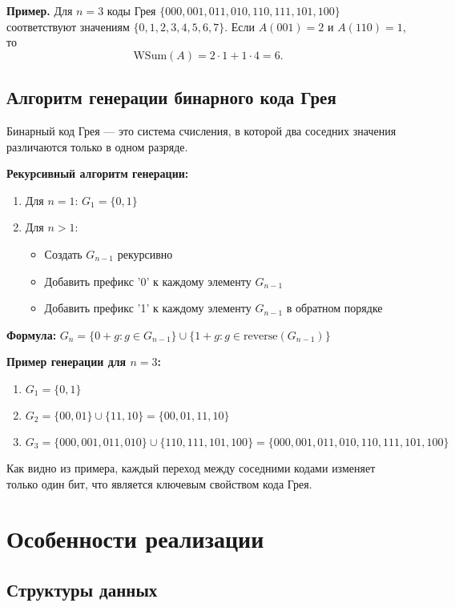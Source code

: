 \documentclass[12pt,a4paper]{article}
\begin{document}
\textbf{Пример.} Для $n=3$ коды Грея $\{000,001,011,010,110,111,101,100\}$ соответствуют значениям $\{0,1,2,3,4,5,6,7\}$. Если $A(001)=2$ и $A(110)=1$, то
$$\text{WSum}(A)=2\cdot 1 + 1\cdot 4 = 6.$$

\subsection{Алгоритм генерации бинарного кода Грея}

Бинарный код Грея — это система счисления, в которой два соседних значения различаются только в одном разряде.

\textbf{Рекурсивный алгоритм генерации:}
\begin{enumerate}
    \item Для $n = 1$: $G_1 = \{0, 1\}$
    \item Для $n > 1$: 
    \begin{itemize}
        \item Создать $G_{n-1}$ рекурсивно
        \item Добавить префикс '0' к каждому элементу $G_{n-1}$
        \item Добавить префикс '1' к каждому элементу $G_{n-1}$ в обратном порядке
    \end{itemize}
\end{enumerate}

\textbf{Формула:} $G_n = \{0 + g : g \in G_{n-1}\} \cup \{1 + g : g \in \text{reverse}(G_{n-1})\}$

\textbf{Пример генерации для $n = 3$:}
\begin{enumerate}
    \item $G_1 = \{0, 1\}$
    \item $G_2 = \{00, 01\} \cup \{11, 10\} = \{00, 01, 11, 10\}$
    \item $G_3 = \{000, 001, 011, 010\} \cup \{110, 111, 101, 100\} = \{000, 001, 011, 010, 110, 111, 101, 100\}$
\end{enumerate}

Как видно из примера, каждый переход между соседними кодами изменяет только один бит, что является ключевым свойством кода Грея.

\newpage

\section{Особенности реализации}

\subsection{Структуры данных}
\end{document}

